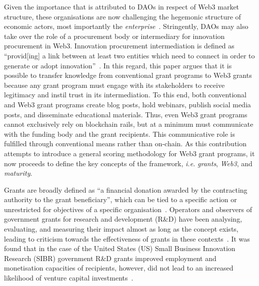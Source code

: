 \documentclass[conference]{IEEEtran}
\begin{document}
Given the importance that is attributed to DAOs in respect of Web3 market structure, these organisations are now challenging the hegemonic structure of economic actors, most importantly the \textit{enterprise}~\cite{wang_novel_2024}. Stringently, DAOs may also take over the role of a procurement body or intermediary for innovation procurement in Web3. Innovation procurement intermediation is defined as “provid[ing] a link between at least two entities which need to connect in order to generate or adopt innovation”~\cite[p.~416]{edler_connecting_2016}. In this regard, this paper argues that it is possible to transfer knowledge from conventional grant programs to Web3 grants because any grant program must engage with its stakeholders to receive legitimacy and instil trust in its intermediation. To this end, both conventional and Web3 grant programs create blog posts, hold webinars, publish social media posts, and disseminate educational materials. Thus, even Web3 grant programs cannot exclusively rely on blockchain rails, but at a minimum must communicate with the funding body and the grant recipients. This communicative role is fulfilled through conventional means rather than on-chain. As this contribution attempts to introduce a general scoring methodology for Web3 grant programs, it now proceeds to define the key concepts of the framework, \textit{i.e.} \textit{grants}, \textit{Web3}, and \textit{maturity}.

Grants are broadly defined as ``a financial donation awarded by the contracting authority to the grant beneficiary'', which can be tied to a specific action or unrestricted for objectives of a specific organisation~\cite{european_commission_grants_2023}. Operators and observers of government grants for research and development (R\&D) have been analysing, evaluating, and measuring their impact almost as long as the concept exists, leading to criticism towards the effectiveness of grants in these contexts~\cite{howell_financing_2017,lerner_government_2000}. It was found that in the case of the United States (US) Small Business Innovation Research (SIBR) government R\&D grants improved employment and monetisation capacities of recipients, however, did not lead to an increased likelihood of venture capital investments~\cite{lerner_government_2000}.
\end{document}
